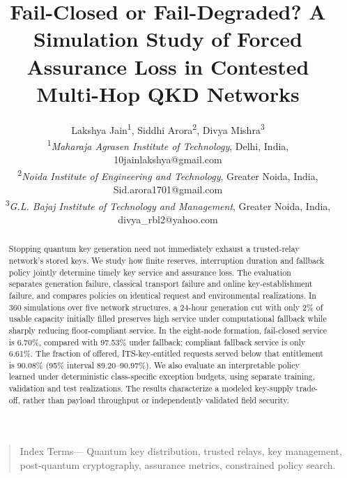 \documentclass[conference,a4paper]{IEEEtran}
\newcommand{\MainClosed}{6.70}
\newcommand{\MainDegraded}{97.53}
\newcommand{\MainQualified}{6.61}
\newcommand{\MainForced}{90.08}
\newcommand{\MainForcedLo}{89.20}
\newcommand{\MainForcedHi}{90.97}
\newcommand{\IEEEauthorblockN}[1]{#1\\}
\newcommand{\IEEEauthorblockA}[1]{#1}
\newcommand{\IEEEauthorrefmark}[1]{\textsuperscript{#1}}
\begin{document}
\title{Fail-Closed or Fail-Degraded? A Simulation Study of Forced Assurance Loss in Contested Multi-Hop QKD Networks}
\author{
\IEEEauthorblockN{Lakshya Jain\IEEEauthorrefmark{1}, Siddhi Arora\IEEEauthorrefmark{2}, Divya Mishra\IEEEauthorrefmark{3}}
\IEEEauthorblockA{\IEEEauthorrefmark{1}\textit{Maharaja Agrasen Institute of Technology}, Delhi, India, 10jainlakshya@gmail.com\\
\IEEEauthorrefmark{2}\textit{Noida Institute of Engineering and Technology}, Greater Noida, India, Sid.arora1701@gmail.com\\
\IEEEauthorrefmark{3}\textit{G.L. Bajaj Institute of Technology and Management}, Greater Noida, India, divya\_rbl2@yahoo.com}}
\maketitle

\begin{abstract}
Stopping quantum key generation need not immediately exhaust a trusted-relay network's stored keys. We study how finite reserves, interruption duration and fallback policy jointly determine timely key service and assurance loss. The evaluation separates generation failure, classical transport failure and online key-establishment failure, and compares policies on identical request and environmental realizations. In 360 simulations over five network structures, a 24-hour generation cut with only 2\% of usable capacity initially filled preserves high service under computational fallback while sharply reducing floor-compliant service. In the eight-node formation, fail-closed service is \MainClosed\%, compared with \MainDegraded\% under fallback; compliant fallback service is only \MainQualified\%. The fraction of offered, ITS-key-entitled requests served below that entitlement is \MainForced\% (95\% interval \MainForcedLo--\MainForcedHi\%). We also evaluate an interpretable policy learned under deterministic class-specific exception budgets, using separate training, validation and test realizations. The results characterize a modeled key-supply trade-off, rather than payload throughput or independently validated field security.
\end{abstract}
\begin{quote}Index Terms---
Quantum key distribution, trusted relays, key management, post-quantum cryptography, assurance metrics, constrained policy search.
\end{quote}
\end{document}
